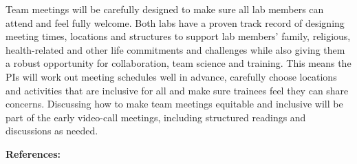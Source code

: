 \documentclass[12pt,oneside]{article}
\begin{document}
Team meetings will be carefully designed to make sure all lab members can attend and feel fully welcome. Both labs have a proven track record of designing meeting times, locations and structures to support lab members' family, religious, health-related and other life commitments and challenges while also giving them a robust opportunity for collaboration, team science and training. This means the PIs will work out meeting schedules well in advance, carefully choose locations and activities that are inclusive for all and make sure trainees feel they can share concerns. Discussing how to make team meetings equitable and inclusive  will be part of the early video-call meetings, including structured readings and discussions as needed. %


\clearpage
\setcounter{page}{1}
{\bf References:}
{\def\section*#1{}
}
\end{document}
